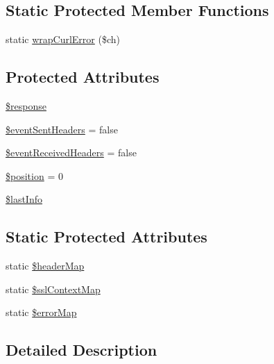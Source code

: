 \subsection*{Static Protected Member Functions}
\begin{DoxyCompactItemize}
\item 
static \hyperlink{classHTTP__Request2__Adapter__Curl_a1ac224c8ce10176a51e756419fc0e374}{wrap\-Curl\-Error} (\$ch)
\end{DoxyCompactItemize}
\subsection*{Protected Attributes}
\begin{DoxyCompactItemize}
\item 
\hyperlink{classHTTP__Request2__Adapter__Curl_a4f2bb3a6dcac6b24cfcf36846921344c}{\$response}
\item 
\hyperlink{classHTTP__Request2__Adapter__Curl_a7676f5068e7106d115b77107ac9b1531}{\$event\-Sent\-Headers} = false
\item 
\hyperlink{classHTTP__Request2__Adapter__Curl_adfd911404ba9642b18156c7e75c1574f}{\$event\-Received\-Headers} = false
\item 
\hyperlink{classHTTP__Request2__Adapter__Curl_aa5d6a073e443ba06f4947ea1ab27643d}{\$position} = 0
\item 
\hyperlink{classHTTP__Request2__Adapter__Curl_afe416c840406d6cf510e0c1cb73afdea}{\$last\-Info}
\end{DoxyCompactItemize}
\subsection*{Static Protected Attributes}
\begin{DoxyCompactItemize}
\item 
static \hyperlink{classHTTP__Request2__Adapter__Curl_a8878ed5fddb43b91450e9359f172838a}{\$header\-Map}
\item 
static \hyperlink{classHTTP__Request2__Adapter__Curl_add699383580a9aea455b7317d07bd5e5}{\$ssl\-Context\-Map}
\item 
static \hyperlink{classHTTP__Request2__Adapter__Curl_a00d7fddefc8d545b63dec0955bd99ae1}{\$error\-Map}
\end{DoxyCompactItemize}


\subsection{Detailed Description}


